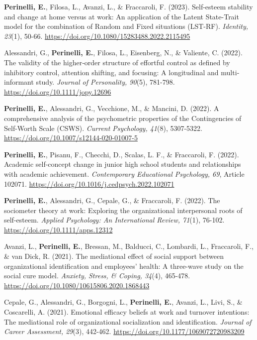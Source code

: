 \documentclass[hidelinks, letterpaper,10pt]{article} %
\begin{document}
\begin{etaremune}
\item \textbf{Perinelli, E.}, Filosa, L., Avanzi, L., \& Fraccaroli, F. (2023). Self-esteem stability and change at home versus at work: An application of the Latent State-Trait model for the combination of Random and Fixed situations (LST-RF). \textit{Identity, 23}(1), 50-66. \url{https://doi.org/10.1080/15283488.2022.2115495}

\item Alessandri, G., \textbf{Perinelli, E.}, Filosa, L., Eisenberg, N., \& Valiente, C. (2022). The validity of the higher‐order structure of effortful control as defined by inhibitory control, attention shifting, and focusing: A longitudinal and multi‐informant study. \textit{Journal of Personality, 90}(5), 781-798. \url{https://doi.org/10.1111/jopy.12696}

\item \textbf{Perinelli, E.}, Alessandri, G., Vecchione, M., \& Mancini, D. (2022). A comprehensive analysis of the psychometric properties of the Contingencies of Self-Worth Scale (CSWS). \textit{Current Psychology, 41}(8), 5307-5322. \url{https://doi.org/10.1007/s12144-020-01007-5} 

\item \textbf{Perinelli, E.}, Pisanu, F., Checchi, D., Scalas, L. F., \& Fraccaroli, F. (2022). Academic self-concept change in junior high school students and relationships with academic achievement. \textit{Contemporary Educational Psychology, 69}, Article 102071. \url{https://doi.org/10.1016/j.cedpsych.2022.102071}

\item \textbf{Perinelli, E.}, Alessandri, G., Cepale, G., \& Fraccaroli, F. (2022). The sociometer theory at work: Exploring the organizational interpersonal roots of self-esteem. \textit{Applied Psychology: An International Review, 71}(1), 76-102. \url{https://doi.org/10.1111/apps.12312}

\item Avanzi, L., \textbf{Perinelli, E.}, Bressan, M., Balducci, C., Lombardi, L., Fraccaroli, F., \& van Dick, R. (2021). The mediational effect of social support between organizational identification and employees’ health: A three-wave study on the social cure model. \textit{Anxiety, Stress, \& Coping, 34}(4), 465-478. \url{https://doi.org/10.1080/10615806.2020.1868443} 

\item Cepale, G., Alessandri, G., Borgogni, L., \textbf{Perinelli, E.}, Avanzi, L., Livi, S., \& Coscarelli, A. (2021). Emotional efficacy beliefs at work and turnover intentions: The mediational role of organizational socialization and identification. \textit{Journal of Career Assessment, 29}(3), 442-462. \url{https://doi.org/10.1177/1069072720983209} 


\end{etaremune}
\end{document}

